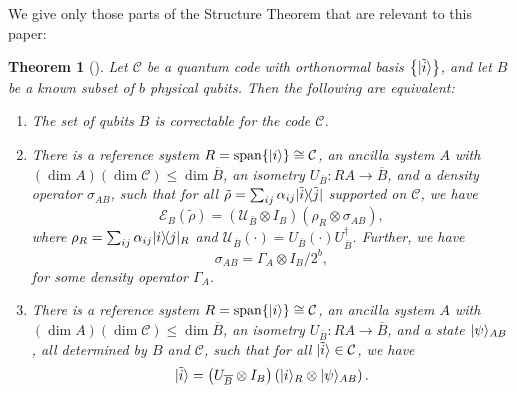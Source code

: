 \documentclass[]{amsart}
\DeclarePairedDelimiter\bra{\langle}{\rvert}
\DeclarePairedDelimiter\ket{\lvert}{\rangle}
\DeclareMathOperator{\Span}{span}
\newtheorem{theorem}{Theorem}
\begin{document}
We give only those parts of the Structure Theorem that are relevant to this paper:
\begin{theorem}[{\cite[Structure Theorem]{CHKNN2025}}]\label{thm:structure}
    Let $\mathcal{C}$ be a quantum code with orthonormal basis $\left\{\ket{\tilde{i}}\right\}$, and let $B$ be a known subset of $b$ physical qubits. Then the following are equivalent:
    \begin{enumerate}
        \item The set of qubits $B$ is correctable for the code $\mathcal{C}$.
        \item There is a reference system $R=\Span\!\left\{\ket{i}\right\}\cong \mathcal{C}$, an ancilla system $A$ with $\left(\dim A\right)\left(\dim \mathcal{C}\right)\leq \dim\overline{B}$, an isometry $U_{\overline{B}}:RA\rightarrow \overline{B}$, and a density operator $\sigma_{AB}$, such that for all $\tilde{\rho}=\sum_{ij}\alpha_{ij}\ket{\tilde{i}}\!\bra{\tilde{j}}$ supported on $\mathcal{C}$, we have
        \begin{equation*}
            \mathcal{E}_B\!\left(\tilde{\rho}\right)= \left(\mathcal{U}_{\overline{B}}\otimes I_B\right) \left(\rho_R\otimes \sigma_{AB}\right),
        \end{equation*}
        where $\rho_R=\sum_{ij}\alpha_{ij}\ket{i}\!\bra{j}_R$ and $\mathcal{U}_{\overline{B}}\!\left(\cdot\right)=U_{\overline{B}}\!\left(\cdot\right)\! U_{\overline{B}}^\dagger$. Further, we have
        \begin{equation*}
            \sigma_{AB}=\Gamma_A\otimes I_B/2^b,
        \end{equation*}
        for some density operator $\Gamma_A$.
        \item There is a reference system $R=\Span\!\left\{\ket{i}\right\}\cong \mathcal{C}$, an ancilla system $A$ with $\left(\dim A\right)\left(\dim \mathcal{C}\right)\leq \dim\overline{B}$, an isometry $U_{\overline{B}}:RA\rightarrow \overline{B}$, and a state $\ket{\psi}_{AB}$, all determined by $B$ and $\mathcal{C}$, such that for all $\ket{\tilde{i}}\in \mathcal{C}$, we have
        \begin{equation*}
            \ket{\tilde{i}}=\left(U_{\overline{B}}\otimes I_B\right)\left(\ket{i}_R\otimes \ket{\psi}_{AB}\right).
        \end{equation*}
    \end{enumerate}

\end{theorem}
\end{document}

